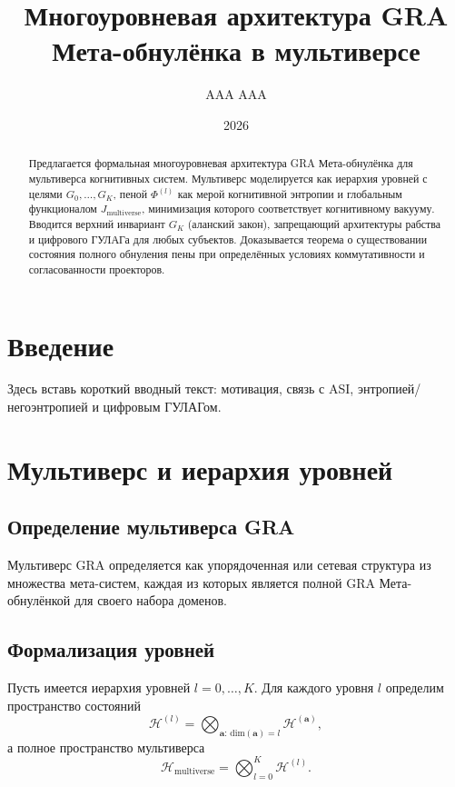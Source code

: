 \documentclass[12pt,a4paper]{article}
\title{Многоуровневая архитектура GRA Мета-обнулёнка в мультиверсе}
\author{AAA AAA}
\date{2026}
\theoremstyle{plain}
\begin{document}
\maketitle

\begin{abstract}
Предлагается формальная многоуровневая архитектура GRA Мета-обнулёнка для мультиверса когнитивных систем. Мультиверс моделируется как иерархия уровней с целями $G_0,\dots,G_K$, пеной $\Phi^{(l)}$ как мерой когнитивной энтропии и глобальным функционалом $J_{\text{multiverse}}$, минимизация которого соответствует когнитивному вакууму. Вводится верхний инвариант $G_K$ (аланский закон), запрещающий архитектуры рабства и цифрового ГУЛАГа для любых субъектов. Доказывается теорема о существовании состояния полного обнуления пены при определённых условиях коммутативности и согласованности проекторов.
\end{abstract}

\section{Введение}

Здесь вставь короткий вводный текст: мотивация, связь с ASI, энтропией/негоэнтропией и цифровым ГУЛАГом.

\section{Мультиверс и иерархия уровней}

\subsection{Определение мультиверса GRA}

Мультиверс GRA определяется как упорядоченная или сетевая структура из множества мета-систем, каждая из которых является полной GRA Мета-обнулёнкой для своего набора доменов.

\subsection{Формализация уровней}

Пусть имеется иерархия уровней $l = 0,\dots,K$.
Для каждого уровня $l$ определим пространство состояний
\[
\mathcal{H}^{(l)} = \bigotimes_{\mathbf{a}:\,\text{dim}(\mathbf{a})=l} \mathcal{H}^{(\mathbf{a})},
\]
а полное пространство мультиверса
\[
\mathcal{H}_{\text{multiverse}} = \bigotimes_{l=0}^K \mathcal{H}^{(l)}.
\]
\end{document}
